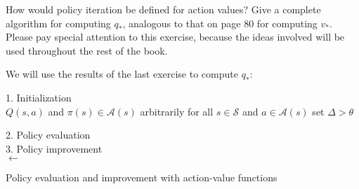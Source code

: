 \begin{exercise}
How would policy iteration be defined for action values?
Give a complete algorithm for computing $q_\ast$, analogous to that on page 80 for computing $v_\ast$.
Please pay special attention to this exercise, because the ideas involved will be used throughout the rest of the book.
\end{exercise}

\begin{solution}
  We will use the results of the last exercise to compute $q_\ast$:

\begin{algorithm}[H]
 {1. Initialization}\\
 {$Q(s,a)$ and $\pi(s)\in \mathcal A(s)$ arbitrarily for all $s \in \mathcal{S}$ and $a \in \mathcal A(s)$}\;
 {set $\Delta > \theta$}

 \BlankLine
 {2. Policy evaluation}\\
  \BlankLine
  {3. Policy improvement} \\
  {\Policy $\leftarrow$ \True}\;
 \caption{Policy evaluation and improvement with action-value functions}
\end{algorithm}

\end{solution}
